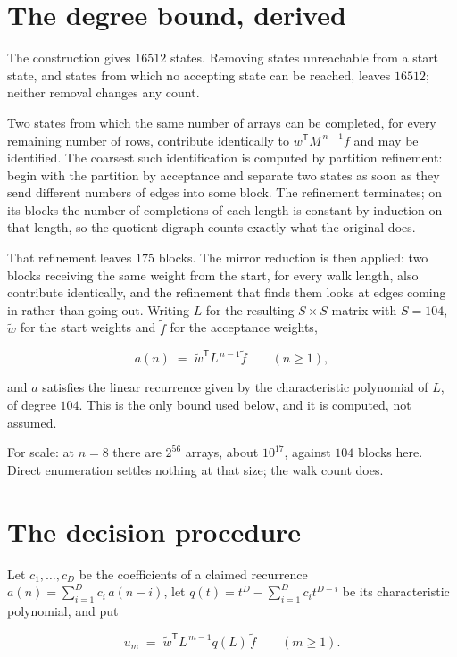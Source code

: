 \documentclass[11pt]{article}
\theoremstyle{definition}
\begin{document}
\section{The degree bound, derived}

The construction gives $16512$ states. Removing states unreachable from a start state, and states from which no accepting state can be reached, leaves $16512$; neither removal changes any count.

Two states from which the same number of arrays can be completed, for every remaining number of rows, contribute identically to $w^{\mathsf T}M^{\,n-1}f$ and may be identified. The coarsest such identification is computed by partition refinement: begin with the partition by acceptance and separate two states as soon as they send different numbers of edges into some block. The refinement terminates; on its blocks the number of completions of each length is constant by induction on that length, so the quotient digraph counts exactly what the original does.

That refinement leaves $175$ blocks. The mirror reduction is then applied: two blocks receiving the same weight from the start, for every walk length, also contribute identically, and the refinement that finds them looks at edges coming in rather than going out. Writing $L$ for the resulting $S \times S$ matrix with $S = 104$, $\tilde w$ for the start weights and $\tilde f$ for the acceptance weights,

\[a(n) \;=\; \tilde w^{\mathsf T} L^{\,n-1} \tilde f \qquad (n \ge 1),\]

and $a$ satisfies the linear recurrence given by the characteristic polynomial of $L$, of degree $104$. This is the only bound used below, and it is computed, not assumed.

For scale: at $n = 8$ there are $2^{56}$ arrays, about $10^{17}$, against $104$ blocks here. Direct enumeration settles nothing at that size; the walk count does.

\section{The decision procedure}

Let $c_1,\dots,c_D$ be the coefficients of a claimed recurrence $a(n) = \sum_{i=1}^{D} c_i\,a(n-i)$, let $q(t) = t^{D} - \sum_{i=1}^{D} c_i t^{D-i}$ be its characteristic polynomial, and put

\[u_m \;=\; \tilde w^{\mathsf T} L^{\,m-1} q(L)\,\tilde f \qquad (m \ge 1).\]
\end{document}
